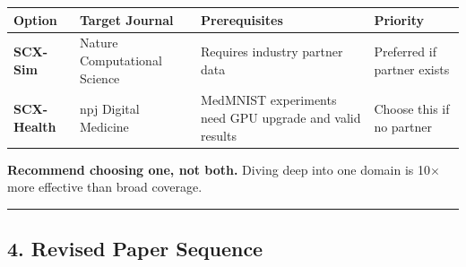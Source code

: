 \documentclass[
  12pt,
]{article}
\begin{document}
\begin{longtable}[]{@{}
  >{\raggedright\arraybackslash}p{}
  >{\raggedright\arraybackslash}p{}
  >{\raggedright\arraybackslash}p{}
  >{\raggedright\arraybackslash}p{}@{}}
\toprule\noalign{}
\begin{minipage}[b]{\linewidth}\raggedright
Option
\end{minipage} & \begin{minipage}[b]{\linewidth}\raggedright
Target Journal
\end{minipage} & \begin{minipage}[b]{\linewidth}\raggedright
Prerequisites
\end{minipage} & \begin{minipage}[b]{\linewidth}\raggedright
Priority
\end{minipage} \\
\midrule\noalign{}
\endhead
\bottomrule\noalign{}
\endlastfoot
\textbf{SCX-Sim} & Nature Computational Science & Requires industry partner data & Preferred if partner exists \\
\textbf{SCX-Health} & npj Digital Medicine & MedMNIST experiments need GPU upgrade and valid results & Choose this if no partner \\
\end{longtable}

\textbf{Recommend choosing one, not both.} Diving deep into one domain is 10$\times$ more effective than broad coverage.

\begin{center}\rule{0.5\linewidth}{0.5pt}\end{center}

\subsection{4. Revised Paper Sequence}\label{revised-paper-sequence}
\end{document}
